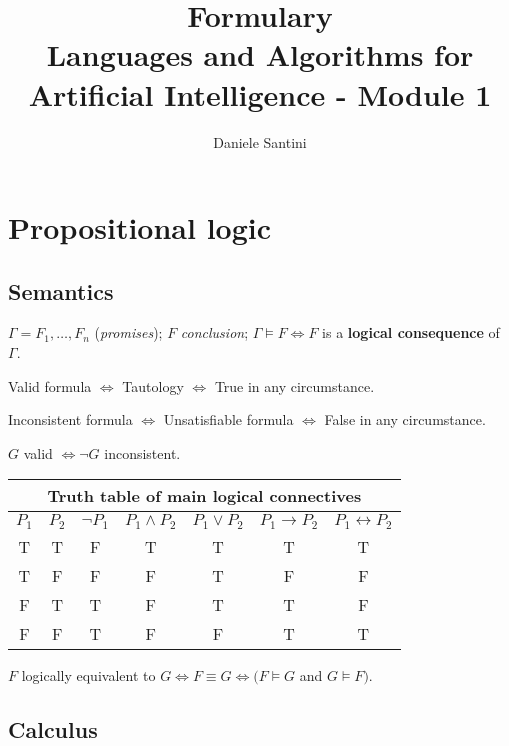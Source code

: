 \documentclass[]{article}
\title{Formulary \\ \large Languages and Algorithms for Artificial Intelligence - Module 1}
\author{Daniele Santini}
\begin{document}

\section{Propositional logic}

\subsection{Semantics}

\noindent $\Gamma = F_1,\dots,F_n$ (\textit{promises});
$F$ \textit{conclusion}; 	
$\Gamma \vDash F \iff F$ is a \textbf{logical consequence} of $\Gamma$.

\noindent Valid formula $\iff$ Tautology $\iff$ True in any circumstance.

\noindent Inconsistent formula $\iff$ Unsatisfiable formula $\iff$ False in any circumstance.

\noindent $G$ valid $\iff \neg G$ inconsistent.

\begin{table}[h]
	\centering
	\begin{tabular}{ |c |c|c | c | c| c | c | } 
		\hline
		\multicolumn{7}{|c|}{Truth table of main logical connectives} \\
		\hline
		\textbf{$P_1$} & \textbf{$P_2$} & \textbf{$\neg P_1$} & \textbf{$P_1 \land P_2$} & \textbf{$P_1 \lor P_2$} & \textbf{$P_1 \rightarrow P_2$} & \textbf{$P_1 \leftrightarrow P_2$} \\
		\hline
		T & T & F & T & T & T & T \\
		\hline
		T & F & F & F & T & F & F \\
		\hline
		F & T & T & F & T & T & F \\
		\hline
		F & F & T & F & F & T & T \\
		\hline
	\end{tabular}
\end{table}

\noindent $F$ logically equivalent to $G \iff F \equiv G \iff (F \vDash G$ and $G \vDash F)$.

\subsection{Calculus}
\end{document}
